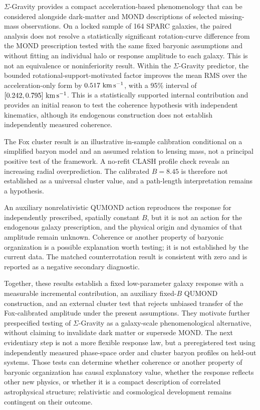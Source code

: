 \documentclass[utf8]{FrontiersinHarvard}
\begin{document}
\(\Sigma\)-Gravity provides a compact acceleration-based phenomenology that can be considered alongside dark-matter and MOND descriptions of selected missing-mass observations. On a locked sample of 164 SPARC galaxies, the paired analysis does not resolve a statistically significant rotation-curve difference from the MOND prescription tested with the same fixed baryonic assumptions and without fitting an individual halo or response amplitude to each galaxy. This is not an equivalence or noninferiority result. Within the \(\Sigma\)-Gravity predictor, the bounded rotational-support-motivated factor improves the mean RMS over the acceleration-only form by \(0.517\ {\rm km\,s^{-1}}\), with a 95\% interval of \([0.242,0.795]\ {\rm km\,s^{-1}}\). This is a statistically supported internal contribution and provides an initial reason to test the coherence hypothesis with independent kinematics, although its endogenous construction does not establish independently measured coherence.

The Fox cluster result is an illustrative in-sample calibration conditional on a simplified baryon model and an assumed relation to lensing mass, not a principal positive test of the framework. A no-refit CLASH profile check reveals an increasing radial overprediction. The calibrated \(B=8.45\) is therefore not established as a universal cluster value, and a path-length interpretation remains a hypothesis.

An auxiliary nonrelativistic QUMOND action reproduces the response for independently prescribed, spatially constant \(B\), but it is not an action for the endogenous galaxy prescription, and the physical origin and dynamics of that amplitude remain unknown. Coherence or another property of baryonic organization is a possible explanation worth testing; it is not established by the current data. The matched counterrotation result is consistent with zero and is reported as a negative secondary diagnostic.

Together, these results establish a fixed low-parameter galaxy response with a measurable incremental contribution, an auxiliary fixed-\(B\) QUMOND construction, and an external cluster test that rejects unbiased transfer of the Fox-calibrated amplitude under the present assumptions. They motivate further prespecified testing of \(\Sigma\)-Gravity as a galaxy-scale phenomenological alternative, without claiming to invalidate dark matter or supersede MOND. The next evidentiary step is not a more flexible response law, but a preregistered test using independently measured phase-space order and cluster baryon profiles on held-out systems. Those tests can determine whether coherence or another property of baryonic organization has causal explanatory value, whether the response reflects other new physics, or whether it is a compact description of correlated astrophysical structure; relativistic and cosmological development remains contingent on their outcome.
\end{document}
